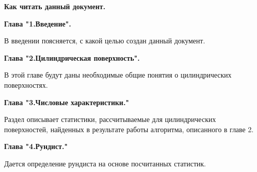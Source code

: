 \begin{center}
	{\Large \textbf{Как читать данный документ.}}
\end{center}

\noindent\Large{\textbf{Глава "1.Введение".}} 

В введении поясняется, с какой целью создан данный документ.\vspace{1cm}

\noindent\Large{\textbf{Глава "2.Цилиндрическая поверхность".}} 

В этой главе будут даны необходимые общие понятия о цилиндрических поверхностях.\vspace{1cm}

\noindent\Large{\textbf{Глава "3.Числовые характеристики."} }

Раздел описывает статистики, рассчитываемые для цилиндрических поверхностей, найденных в результате работы алгоритма, описанного в главе 2.\vspace{1cm}

\noindent\Large{\textbf{Глава "4.Рундист."} }

Дается определение рундиста на основе посчитанных статистик.\newpage

